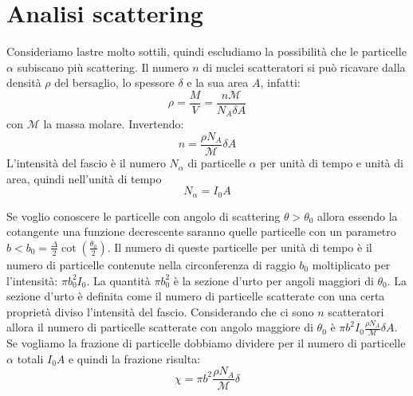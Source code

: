 \section{Analisi scattering}
Consideriamo lastre molto sottili, quindi escludiamo la possibilità che le particelle $\alpha$ subiscano più scattering. Il numero $n$ di nuclei scatteratori si può ricavare dalla densità $\rho$ del bersaglio, lo spessore $\delta$ e la sua area $A$, infatti:
\begin{equation*}
\rho=\frac{M}{V}=\frac{n\mathcal{M}}{N_A\delta A}
\end{equation*}
con $\mathcal{M}$ la massa molare. Invertendo:
\begin{equation}
n=\frac{\rho N_A}{\mathcal{M}}\delta A
\end{equation}
L'intensità del fascio è il numero $N_\alpha$ di particelle $\alpha$ per unità di tempo e unità di area, quindi nell'unità di tempo
\begin{equation}
N_\alpha=I_0A
\end{equation}

Se voglio conoscere le particelle con angolo di scattering $\theta>\theta_0$ allora essendo la cotangente una funzione decrescente saranno quelle particelle con un parametro $b<b_0=\frac{\Delta}{2}\cot\left(\frac{\theta_0}{2}\right)$. Il numero di queste particelle per unità di tempo è il numero di particelle contenute nella circonferenza di raggio $b_0$ moltiplicato per l'intensità: $\pi b_0^2I_0$. La quantità $\pi b_0^2$ è la sezione d'urto per angoli maggiori di $\theta_0$. La sezione d'urto è definita come il numero di particelle scatterate con una certa proprietà diviso l'intensità del fascio. Considerando che ci sono $n$ scatteratori allora il numero di particelle scatterate con angolo maggiore di $\theta_0$ è $\pi b^2I_0\frac{\rho N_A}{\mathcal{M}}\delta A$. Se vogliamo la frazione di particelle dobbiamo dividere per il numero di particelle $\alpha$ totali $I_0A$ e quindi la frazione risulta:
\begin{equation}
\chi=\pi b^2\frac{\rho N_A}{\mathcal{M}}\delta
\end{equation}

